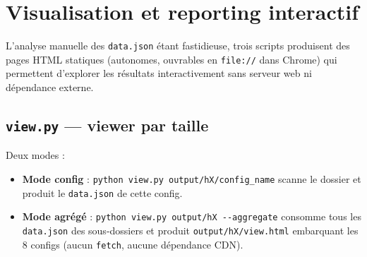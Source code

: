 \section{Visualisation et reporting interactif}

L'analyse manuelle des \texttt{data.json} étant fastidieuse, trois scripts produisent des
pages HTML statiques (autonomes, ouvrables en \texttt{file://} dans Chrome) qui permettent
d'explorer les résultats interactivement sans serveur web ni dépendance externe.

\subsection{\texttt{view.py} — viewer par taille}

Deux modes :
\begin{itemize}
  \item \textbf{Mode config} : \texttt{python view.py output/hX/config\_name} scanne le
    dossier et produit le \texttt{data.json} de cette config.
  \item \textbf{Mode agrégé} : \texttt{python view.py output/hX -{}-aggregate} consomme tous
    les \texttt{data.json} des sous-dossiers et produit \texttt{output/hX/view.html}
    embarquant les 8 configs (aucun \texttt{fetch}, aucune dépendance CDN).
\end{itemize}

